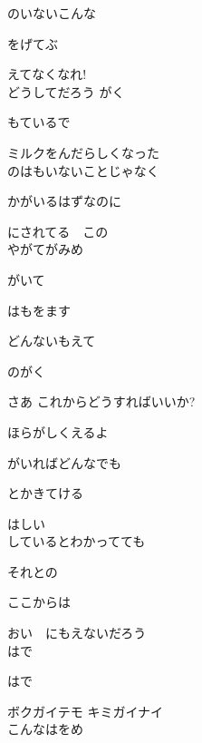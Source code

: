 のいないこんな

をげてぶ

えてなくなれ!
\\

どうしてだろう がく

もているで

ミルクをんだらしくなった
\\

のはもいないことじゃなく

かがいるはずなのに

にされてる　この
\\

やがてがみめ

がいて

はもをます

どんないもえて

のがく

さあ これからどうすればいいか?

ほらがしくえるよ

がいればどんなでも

とかきてける

はしい
\\

しているとわかってても

それとの

ここからは

おい　にもえないだろう
\\

はで

はで

ボクガイテモ キミガイナイ
\\

こんなはをめ

